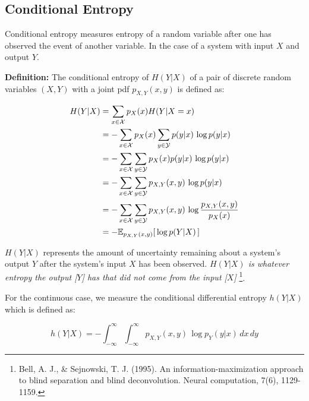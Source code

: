 
\subsection{Conditional Entropy}

Conditional entropy measures entropy of a random variable after one has observed the event of another variable.
In the case of a system with input $X$ and output $Y$.

\textbf{Definition:} 
The conditional entropy of $H(Y|X)$ of a pair of discrete random variables $(X,Y)$ with a joint pdf $p_{X,Y}(x,y)$ is defined as:

\begin{align}
\label{eq:entropycond}
H(Y|X) 
&= \sum_{x \in \mathcal{X}} p_X(x) H(Y|X=x) \\
&= -\sum_{x \in \mathcal{X}} p_X(x) \sum_{y \in \mathcal{Y}} p(y|x)\,\log p(y|x) \\
&= -\sum_{x \in \mathcal{X}} \sum_{y \in \mathcal{Y}} p_X(x) p(y|x)\,\log p(y|x) \\
&= -\sum_{x \in \mathcal{X}} \sum_{y \in \mathcal{Y}} p_{X,Y}(x,y)\,\log p(y|x) \\
&= -\sum_{x \in \mathcal{X}} \sum_{y \in \mathcal{Y}} p_{X,Y}(x,y)\,\log \frac{p_{X,Y}(x,y)}{p_X(x)} \\
&= -\mathbb{E}_{p_{X,Y}(x,y)} \lbrack \, \log p(Y|X) \, \rbrack \\
\end{align}

$H(Y|X)$ represents the amount of uncertainty remaining about a system's output $Y$ after the 
system's input $X$ has been observed. 
\emph{
$H(Y|X)$ is whatever entropy the output [$Y$] has that did not come from the input [$X$]
}
\footnote{
Bell, A. J., \& Sejnowski, T. J. (1995). An information-maximization approach to blind separation and blind deconvolution. Neural computation, 7(6), 1129-1159.
}.

For the continuous case, we measure the conditional differential entropy $h(Y|X)$ which is defined as:

\begin{equation}
h(Y|X) = -\int_{-\infty}^{\infty} \int_{-\infty}^{\infty} p_{X,Y}(x,y)\,\log  p_{Y}(y|x) \, dx \, dy
\label{eq:diffentropycondcontinuous}
\end{equation}


